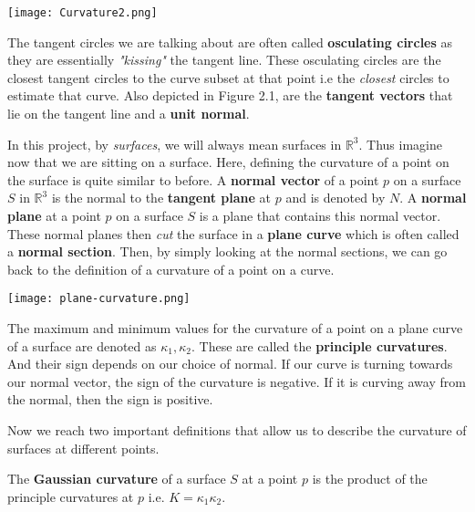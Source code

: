 \documentclass[a4paper,12pt]{report}
\begin{document}
\begin{center}
\texttt{[image: Curvature2.png]}
\end{center}

\hspace{-0.66cm}The tangent circles we are talking about are often called \textbf{osculating circles} as they are essentially \textit{"kissing"} the tangent line. These osculating circles are the closest tangent circles to the curve subset at that point i.e the \textit{closest} circles to estimate that curve. Also depicted in Figure 2.1, are the \textbf{tangent vectors} that lie on the tangent line and a \textbf{unit normal}.\newline

\hspace{-0.66cm}In this project, by \textit{surfaces}, we will always mean surfaces in $\mathbb{R}^{3}$. Thus imagine now that we are sitting on a surface. Here, defining the curvature of a point on the surface is quite similar to before. A \textbf{normal vector} of a point $p$ on a surface $S$ in $\mathbb{R}^{3}$ is the normal to the \textbf{tangent plane} at $p$ and is denoted by $N$. A \textbf{normal plane} at a point $p$ on a surface $S$ is a plane that contains this normal vector. These normal planes then \textit{cut} the surface in a \textbf{plane curve} which is often called a \textbf{normal section}. Then, by simply looking at the normal sections, we can go back to the definition of a curvature of a point on a curve.

\begin{center}\texttt{[image: plane-curvature.png]}
\end{center}

The maximum and minimum values for the curvature of a point on a plane curve of a surface are denoted as $\kappa_{1}, \kappa_{2}$. These are called the \textbf{principle curvatures}. And their sign depends on our choice of normal. If our curve is turning towards our normal vector, the sign of the curvature is negative. If it is curving away from the normal, then the sign is positive.\newline

Now we reach two important definitions that allow us to describe the curvature of surfaces at different points.

\begin{definition}
The \textbf{Gaussian curvature} of a surface $S$ at a point $p$ is the product of the principle curvatures at $p$ i.e. $K = \kappa_{1}\kappa_{2}$.
\end{definition}
\end{document}
